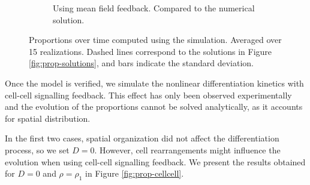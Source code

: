 \begin{figure}[ht]
\begin{subfigure}{0.47\textwidth}
        \caption{Using mean field feedback. Compared to the numerical solution.}
    \end{subfigure}
    \caption{Proportions over time computed using the simulation. Averaged over 15 realizations. Dashed lines correspond to the solutions in Figure \ref{fig:prop-solutions}, and bars indicate the standard deviation.}
    \label{fig:prop-itworks}
\end{figure}

Once the model is verified, we simulate the nonlinear differentiation kinetics with cell-cell signalling feedback. This effect has only been observed experimentally and the evolution of the proportions cannot be solved analytically, as it accounts for spatial distribution. 

In the first two cases, spatial organization did not affect the differentiation process, so we set $D=0$. However, cell rearrangements might influence the evolution when using cell-cell signalling feedback. We present the results obtained for $D=0$ and $\rho=\rho_1$ in Figure \ref{fig:prop-cellcell}.

